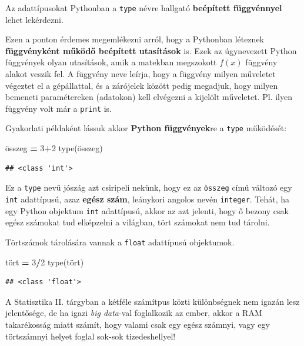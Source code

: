 \documentclass[
]{book}
\newenvironment{Shaded}{\begin{snugshade}}{\end{snugshade}}
\newcommand{\BuiltInTok}[1]{#1}
\newcommand{\DecValTok}[1]{\textcolor[rgb]{0.00,0.00,0.81}{#1}}
\newcommand{\NormalTok}[1]{#1}
\newcommand{\OperatorTok}[1]{\textcolor[rgb]{0.81,0.36,0.00}{\textbf{#1}}}
\begin{document}
Az adattípusokat Pythonban a \texttt{type} névre hallgató \textbf{beépített függvénnyel} lehet lekérdezni.

Ezen a ponton érdemes megemlékezni arról, hogy a Pythonban léteznek \textbf{függvényként működő beépített utasítások} is. Ezek az úgynevezett Python függvények olyan utasítások, amik a matekban megszokott \(f(x)\) függvény alakot veszik fel.
A függvény neve leírja, hogy a függvény milyen műveletet végeztet el a gépállattal, és a zárójelek között pedig megadjuk, hogy milyen bemeneti paramétereken (adatokon) kell elvégezni a kijelölt műveletet. Pl. ilyen függvény volt már a \texttt{print} is.

Gyakorlati példaként lássuk akkor \textbf{Python függvények}re a \texttt{type} működését:

\begin{Shaded}
\begin{Highlighting}[]
\NormalTok{összeg }\OperatorTok{=} \DecValTok{3}\OperatorTok{+}\DecValTok{2}
\BuiltInTok{type}\NormalTok{(összeg)}
\end{Highlighting}
\end{Shaded}

\begin{verbatim}
## <class 'int'>
\end{verbatim}

Ez a \texttt{type} nevű jószág azt csiripeli nekünk, hogy ez az \texttt{összeg} című változó egy \texttt{int} adattípusú, azaz \textbf{egész szám}, leánykori angolos nevén \texttt{integer}. Tehát, ha egy Python objektum \texttt{int} adattípusú, akkor az azt jelenti, hogy ő bezony csak egész számokat tud elképzelni a világban, tört számokat nem tud tárolni.

Törtszámok tárolására vannak a \texttt{float} adattípusú objektumok.

\begin{Shaded}
\begin{Highlighting}[]
\NormalTok{tört }\OperatorTok{=} \DecValTok{3}\OperatorTok{/}\DecValTok{2}
\BuiltInTok{type}\NormalTok{(tört)}
\end{Highlighting}
\end{Shaded}

\begin{verbatim}
## <class 'float'>
\end{verbatim}

A Statisztika II. tárgyban a kétféle számítpus közti különbségnek nem igazán lesz jelentősége, de ha igazi \emph{big data}-val foglalkozik az ember, akkor a RAM takarékosság miatt számít, hogy valami csak egy egész számnyi, vagy egy törtszámnyi helyet foglal sok-sok tizedeshellyel!
\end{document}
